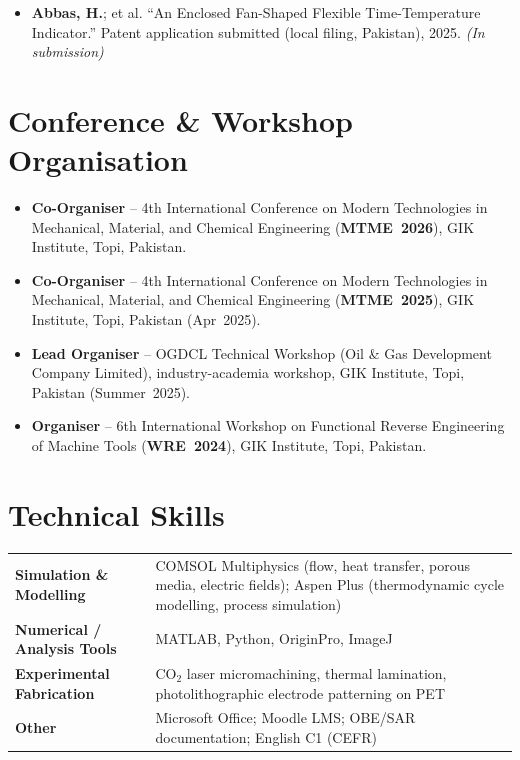 \documentclass[11pt,a4paper]{article}
\begin{document}
\begin{itemize}
  \item \textbf{Abbas, H.}; et al. ``An Enclosed Fan-Shaped Flexible
        Time-Temperature Indicator.'' Patent application submitted (local filing,
        Pakistan), 2025. \textit{(In submission)}
\end{itemize}

\section{Conference \& Workshop Organisation}

\begin{itemize}
  \item \textbf{Co-Organiser} -- 4th International Conference on Modern
        Technologies in Mechanical, Material, and Chemical Engineering
        (\textbf{MTME~2026}), GIK Institute, Topi, Pakistan.
  \item \textbf{Co-Organiser} -- 4th International Conference on Modern
        Technologies in Mechanical, Material, and Chemical Engineering
        (\textbf{MTME~2025}), GIK Institute, Topi, Pakistan (Apr~2025).
  \item \textbf{Lead Organiser} -- OGDCL Technical Workshop (Oil \& Gas
        Development Company Limited), industry-academia workshop, GIK Institute,
        Topi, Pakistan (Summer~2025).
  \item \textbf{Organiser} -- 6th International Workshop on Functional Reverse
        Engineering of Machine Tools (\textbf{WRE~2024}), GIK Institute,
        Topi, Pakistan.
\end{itemize}

\section{Technical Skills}

\begin{tabularx}{\textwidth}{@{}>{\bfseries}lX@{}}
Simulation \& Modelling
  & COMSOL Multiphysics (flow, heat transfer, porous media, electric fields);
    Aspen Plus (thermodynamic cycle modelling, process simulation) \\[3pt]
Numerical / Analysis Tools
  & MATLAB, Python, OriginPro, ImageJ \\[3pt]
Experimental Fabrication
  & CO$_2$ laser micromachining, thermal lamination, photolithographic electrode
    patterning on PET \\[3pt]
Other
  & Microsoft Office; Moodle LMS; OBE/SAR documentation; English C1 (CEFR) \\
\end{tabularx}
\end{document}
